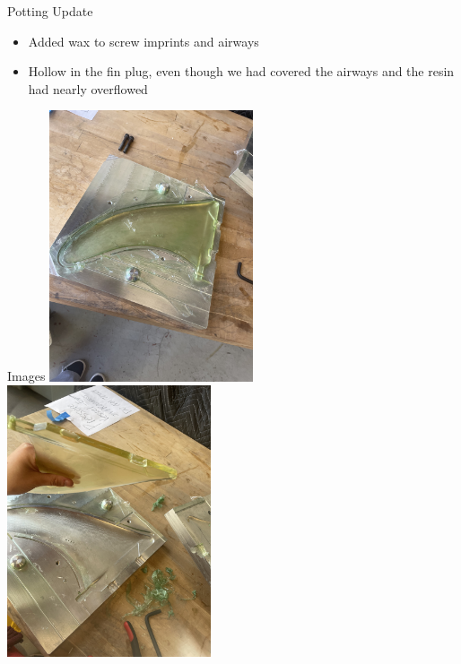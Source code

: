 
\begin{frame}{Potting Update}
    \begin{itemize}
        \item Added wax to screw imprints and airways
        \item Hollow in the fin plug, even though we had covered the airways and the resin had nearly overflowed
    \end{itemize}    
\end{frame}

\begin{frame}{Images}
    \centering
    \includegraphics[height=0.45\textheight,width=0.45\textwidth,keepaspectratio]{images/sf_img_7573.jpg}
    \includegraphics[height=0.45\textheight,width=0.45\textwidth,keepaspectratio]{images/sf_img_7575.jpg}

\end{frame}
